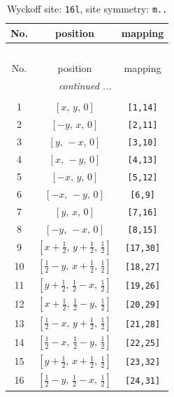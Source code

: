 \documentclass[fleqn,8pt]{jsarticle}
\begin{document}
\renewcommand{\arraystretch}{1.2}
\begin{longtable}{ccc}
\caption{Wyckoff site: {\tt 16l}, site symmetry: {\tt m..}}
 \\
 \hline \hline
No. & position & mapping \\ \hline \endfirsthead

\multicolumn{2}{l}{\tablename\ \thetable{}} \\
 \hline \hline
No. & position & mapping \\ \hline \endhead

 \hline \hline
\multicolumn{2}{r}{\footnotesize\it continued ...} \\ \endfoot

 \hline \hline
\multicolumn{2}{r}{} \\ \endlastfoot

1 & $\left[ x,\, y,\, 0 \right]$ & {\tt [1,14]} \\ \hline
2 & $\left[ - y,\, x,\, 0 \right]$ & {\tt [2,11]} \\ \hline
3 & $\left[ y,\, - x,\, 0 \right]$ & {\tt [3,10]} \\ \hline
4 & $\left[ x,\, - y,\, 0 \right]$ & {\tt [4,13]} \\ \hline
5 & $\left[ - x,\, y,\, 0 \right]$ & {\tt [5,12]} \\ \hline
6 & $\left[ - x,\, - y,\, 0 \right]$ & {\tt [6,9]} \\ \hline
7 & $\left[ y,\, x,\, 0 \right]$ & {\tt [7,16]} \\ \hline
8 & $\left[ - y,\, - x,\, 0 \right]$ & {\tt [8,15]} \\ \hline
9 & $\left[ x + \frac{1}{2},\, y + \frac{1}{2},\, \frac{1}{2} \right]$ & {\tt [17,30]} \\ \hline
10 & $\left[ \frac{1}{2} - y,\, x + \frac{1}{2},\, \frac{1}{2} \right]$ & {\tt [18,27]} \\ \hline
11 & $\left[ y + \frac{1}{2},\, \frac{1}{2} - x,\, \frac{1}{2} \right]$ & {\tt [19,26]} \\ \hline
12 & $\left[ x + \frac{1}{2},\, \frac{1}{2} - y,\, \frac{1}{2} \right]$ & {\tt [20,29]} \\ \hline
13 & $\left[ \frac{1}{2} - x,\, y + \frac{1}{2},\, \frac{1}{2} \right]$ & {\tt [21,28]} \\ \hline
14 & $\left[ \frac{1}{2} - x,\, \frac{1}{2} - y,\, \frac{1}{2} \right]$ & {\tt [22,25]} \\ \hline
15 & $\left[ y + \frac{1}{2},\, x + \frac{1}{2},\, \frac{1}{2} \right]$ & {\tt [23,32]} \\ \hline
16 & $\left[ \frac{1}{2} - y,\, \frac{1}{2} - x,\, \frac{1}{2} \right]$ & {\tt [24,31]} \\
\end{longtable}
\end{document}

